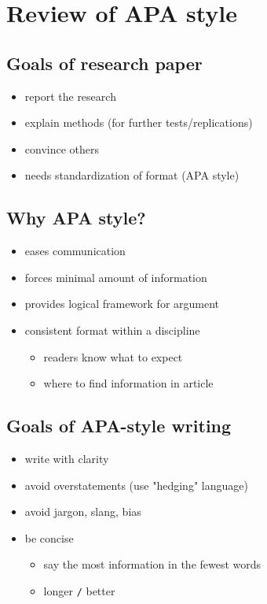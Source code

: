 \documentclass[11pt]{article}
\begin{document}
\section*{Review of APA style}
\label{sec-2}
\subsection*{Goals of research paper}
\label{sec-2-1}
\begin{itemize}
\item report the research
\item explain methods (for further tests/replications)
\item convince others
\item needs standardization of format (APA style)
\end{itemize}

\subsection*{Why APA style?}
\label{sec-2-2}
\begin{itemize}
\item eases communication
\item forces minimal amount of information
\item provides logical framework for argument
\item consistent format within a discipline
\begin{itemize}
\item readers know what to expect
\item where to find information in article
\end{itemize}
\end{itemize}

\subsection*{Goals of APA-style writing}
\label{sec-2-3}
\begin{itemize}
\item write with clarity
\item avoid overstatements (use "hedging" language)
\item avoid jargon, slang, bias
\item be concise
\begin{itemize}
\item say the most information in the fewest words
\item longer \texttt{/} better
\end{itemize}
\end{itemize}
\end{document}
